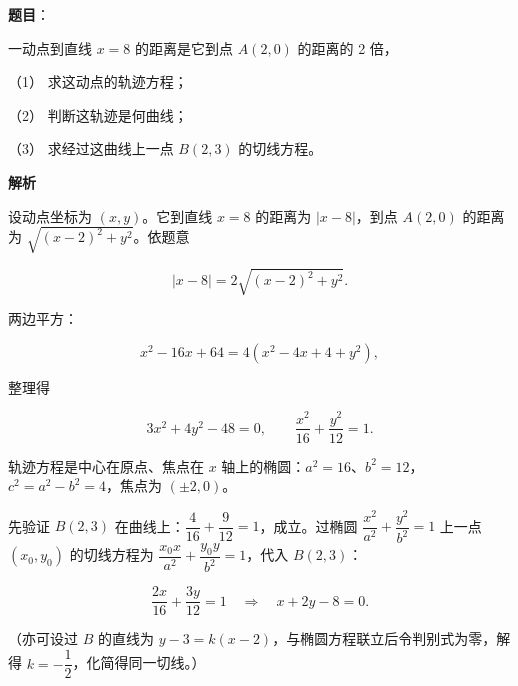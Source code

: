 \begin{answer}

\textbf{题目}：

一动点到直线 $x=8$ 的距离是它到点 $A(2,0)$ 的距离的 2 倍，

（1） 求这动点的轨迹方程；

（2） 判断这轨迹是何曲线；

（3） 求经过这曲线上一点 $B(2,3)$ 的切线方程。

\textbf{解析}


设动点坐标为 $(x,y)$。它到直线 $x=8$ 的距离为 $|x-8|$，到点 $A(2,0)$ 的距离为 $\sqrt{(x-2)^2+y^2}$。依题意

\nopagebreak[4]
\[
|x-8|=2\sqrt{(x-2)^2+y^2}.
\]

两边平方：

\nopagebreak[4]
\[
x^2-16x+64=4\left(x^2-4x+4+y^2\right),
\]

整理得

\nopagebreak[4]
\[
3x^2+4y^2-48=0,
\qquad
\frac{x^2}{16}+\frac{y^2}{12}=1.
\]


轨迹方程是中心在原点、焦点在 $x$ 轴上的椭圆：$a^2=16$、$b^2=12$，$c^2=a^2-b^2=4$，焦点为 $(\pm2,0)$。


先验证 $B(2,3)$ 在曲线上：$\dfrac{4}{16}+\dfrac{9}{12}=1$，成立。过椭圆 $\dfrac{x^2}{a^2}+\dfrac{y^2}{b^2}=1$ 上一点 $(x_0,y_0)$ 的切线方程为 $\dfrac{x_0x}{a^2}+\dfrac{y_0y}{b^2}=1$，代入 $B(2,3)$：

\nopagebreak[4]
\[
\frac{2x}{16}+\frac{3y}{12}=1
\quad\Longrightarrow\quad
x+2y-8=0.
\]

（亦可设过 $B$ 的直线为 $y-3=k(x-2)$，与椭圆方程联立后令判别式为零，解得 $k=-\dfrac12$，化简得同一切线。）




\end{answer}